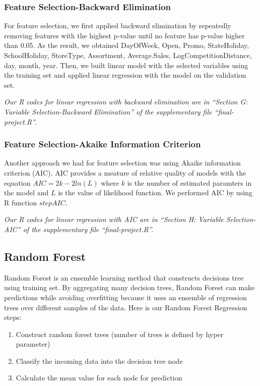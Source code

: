 \documentclass[letterpaper,twocolumn,11pt]{article}
\begin{document}
\subsubsection{Feature Selection-Backward Elimination}
For feature selection, we first applied backward elimination by repeatedly removing features with the highest p-value until no feature has p-value higher than 0.05. As the result, we obtained DayOfWeek, Open, Promo, StateHoliday, SchoolHoliday, StoreType, Assortment, Average.Sales, LogCompetitionDistance, day, month, year. Then, we built linear model with the selected variables using the training set and applied linear regression with the model on the validation set.

\textit{Our R codes for linear regression with backward elimination are in ``Section G: Variable Selection-Backward Elimination'' of the supplementary file ``final-project.R''.}

\subsubsection{Feature Selection-Akaike Information Criterion}
Another approach we had for feature selection was using Akaike information criterion (AIC). AIC provides a meature of relative quality of models with the equation $AIC = 2k - 2 ln(L)$ where $k$ is the number of estimated paramters in the model and $L$ is the value of likelihood function. We performed AIC by using R function $stepAIC$.

\textit{Our R codes for linear regression with AIC are in ``Section H: Variable Selection-AIC'' of the supplementary file ``final-project.R''.}

\subsection{Random Forest}
Random Forest is an ensemble learning method that constructs decisions tree using training set. By aggregating many decision trees, Random Forest can make predictions while avoiding overfitting because it uses an ensemble of regression trees over different samples of the data. Here is our Random Forest Regression steps: \\
\begin{enumerate}
\item Construct random forest trees (number of trees is defined by hyper parameter)
\item Classify the incoming data into the decision tree node
\item Calculate the mean value for each node for prediction
\end{enumerate}
\end{document}
